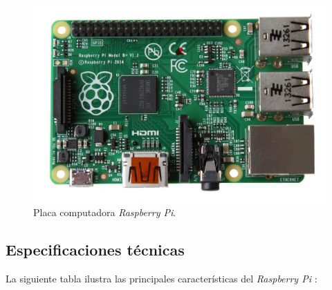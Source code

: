 \begin{figure}[H]
	\noindent \begin{centering}
		\includegraphics[width=\linewidth/2]{capitulo3/raspberry}
		\par\end{centering}
	\smallskip
	\caption{\label{fig:raspberry} Placa computadora \textit{Raspberry Pi}.}
\end{figure} 

\smallskip

\subsection{Especificaciones técnicas}

La siguiente tabla ilustra las principales características del \textit{Raspberry Pi} \cite{raspberry}:

\smallskip

